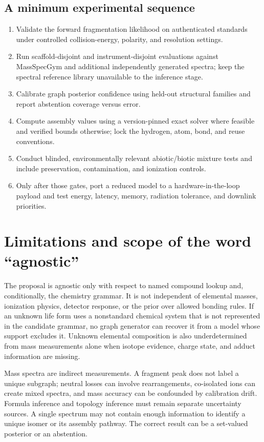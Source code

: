 \documentclass[10pt,a4paper]{article}
\begin{document}
\subsection{A minimum experimental sequence}
\begin{enumerate}
\item Validate the forward fragmentation likelihood on authenticated standards under controlled collision-energy, polarity, and resolution settings.
\item Run scaffold-disjoint and instrument-disjoint evaluations against MassSpecGym and additional independently generated spectra; keep the spectral reference library unavailable to the inference stage.
\item Calibrate graph posterior confidence using held-out structural families and report abstention coverage versus error.
\item Compute assembly values using a version-pinned exact solver where feasible and verified bounds otherwise; lock the hydrogen, atom, bond, and reuse conventions.
\item Conduct blinded, environmentally relevant abiotic/biotic mixture tests and include preservation, contamination, and ionization controls.
\item Only after those gates, port a reduced model to a hardware-in-the-loop payload and test energy, latency, memory, radiation tolerance, and downlink priorities.
\end{enumerate}

\section{Limitations and scope of the word ``agnostic''}
The proposal is agnostic only with respect to named compound lookup and, conditionally, the chemistry grammar. It is not independent of elemental masses, ionization physics, detector response, or the prior over allowed bonding rules. If an unknown life form uses a nonstandard chemical system that is not represented in the candidate grammar, no graph generator can recover it from a model whose support excludes it. Unknown elemental composition is also underdetermined from mass measurements alone when isotope evidence, charge state, and adduct information are missing.

Mass spectra are indirect measurements. A fragment peak does not label a unique subgraph; neutral losses can involve rearrangements, co-isolated ions can create mixed spectra, and mass accuracy can be confounded by calibration drift. Formula inference and topology inference must remain separate uncertainty sources. A single spectrum may not contain enough information to identify a unique isomer or its assembly pathway. The correct result can be a set-valued posterior or an abstention.
\end{document}
